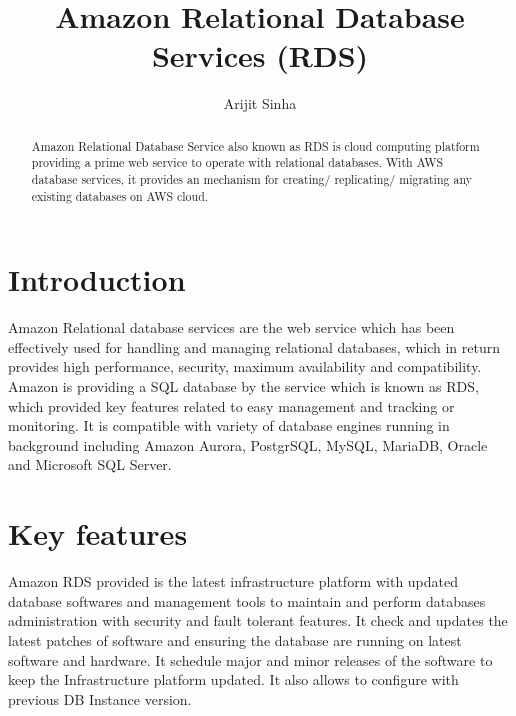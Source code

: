
\title{Amazon Relational Database Services (RDS)}

\author{Arijit Sinha}

\renewcommand{\shortauthors}{A.Sinha}

\begin{abstract}
Amazon Relational Database Service also known as RDS is cloud 
computing platform providing a prime web service to operate 
with relational databases. With AWS database services, 
it provides an mechanism for creating/ replicating/ migrating 
any existing databases on AWS cloud.

\end{abstract}


\maketitle

\section{Introduction}
Amazon Relational database services are the web service which 
has been effectively used for  handling and managing relational 
databases, which in return provides high performance, security, 
maximum availability and compatibility. 
Amazon is providing a SQL database by the service which is known 
as RDS, which provided key features related to easy management 
and tracking or monitoring.
It is compatible with variety of database engines running in 
background including Amazon Aurora, PostgrSQL, MySQL, MariaDB, 
Oracle and Microsoft SQL Server.

\section{Key features}
Amazon RDS provided is the latest infrastructure platform with 
updated database softwares and management tools to maintain and 
perform databases administration with security and fault tolerant 
features. It check and updates the latest patches of software and 
ensuring the database are running on latest software and hardware. 
It schedule major and minor releases of the software to keep the 
Infrastructure platform updated. It also allows to configure with 
previous DB Instance version.

